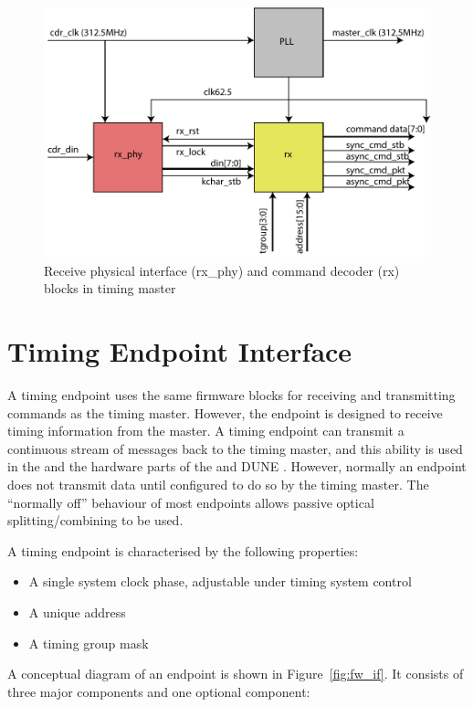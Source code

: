 \documentclass{dune}
\begin{document}
\begin{figure}[h!]
    \centering
    \includegraphics{timing_system_rx_02-crop.pdf}
    \caption{Receive physical interface (rx\_phy) and command decoder (rx) blocks in timing master}
    \label{fig:rx_rxPhy}
\end{figure}

\section{Timing Endpoint Interface}

A timing endpoint uses the same firmware blocks for receiving and transmitting commands as the timing master. However, the endpoint is designed to receive timing information from the master. A timing endpoint can transmit a continuous stream of messages back to the timing master, and this ability is used in the   and the hardware parts of the  and DUNE  . However, normally an endpoint does not transmit data until configured to do so by the timing master. The ``normally off'' behaviour of most endpoints allows passive optical splitting/combining to be used. 

A timing endpoint is characterised by the following properties:

\begin{itemize}
	\item A single system clock phase, adjustable under timing system control
	\item A unique address
	\item A timing group mask
\end{itemize}

A conceptual diagram of an endpoint is shown in Figure~\ref{fig:fw_if}. It consists of three major components and one optional component:
\end{document}
